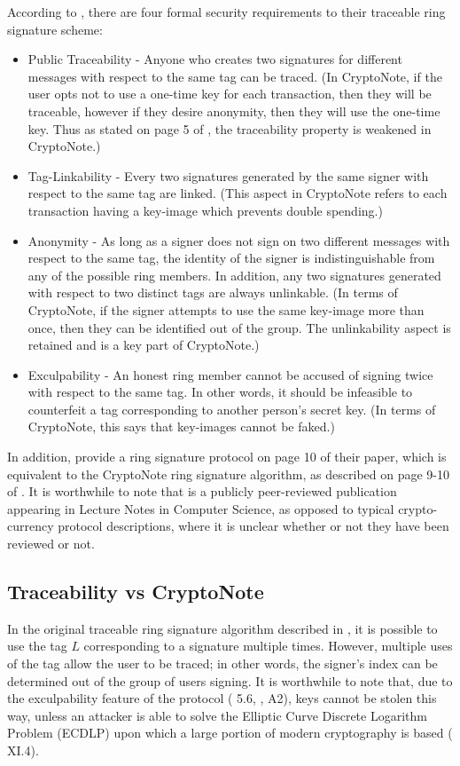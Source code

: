 \documentclass[12pt,english]{mrl}
\numberwithin{equation}{section}
\numberwithin{figure}{section}
\begin{document}
According to \cite{FS}, there are four formal security requirements
to their traceable ring signature scheme:
\begin{itemize}
\item Public Traceability - Anyone who creates two signatures for different
messages with respect to the same tag can be traced. (In CryptoNote,
if the user opts not to use a one-time key for each transaction, then
they will be traceable, however if they desire anonymity, then they
will use the one-time key. Thus as stated on page 5 of \cite{CN},
the traceability property is weakened in CryptoNote.) 
\item Tag-Linkability - Every two signatures generated by the same signer
with respect to the same tag are linked. (This aspect in CryptoNote
refers to each transaction having a key-image which
prevents double spending.) %


\item Anonymity - As long as a signer does not sign on two different messages
with respect to the same tag, the identity of the signer is indistinguishable
from any of the possible ring members. In addition, any two signatures
generated with respect to two distinct tags are always unlinkable.
(In terms of CryptoNote, if the signer attempts to use the same key-image
more than once, then they can be identified out of the group. The
unlinkability aspect is retained and is a key part of CryptoNote.)
\item Exculpability - An honest ring member cannot be accused of signing
twice with respect to the same tag. In other words, it should be infeasible
to counterfeit a tag corresponding to another person's secret key.
(In terms of CryptoNote, this says that key-images cannot be faked.)
\end{itemize}
In addition, \cite{FS} provide a ring signature protocol on page
10 of their paper, which is equivalent to the CryptoNote ring signature
algorithm, as described on page 9-10 of \cite{CN}. It is worthwhile
to note that \cite{FS} is a publicly peer-reviewed publication appearing
in Lecture Notes in Computer Science, as opposed to typical crypto-currency
protocol descriptions, where it is  unclear whether or not they have been reviewed or not. 


\subsection{Traceability vs CryptoNote}

In the original traceable ring signature algorithm described in \cite{FS},
it is possible to use the tag $L$ corresponding to a signature multiple
times. However, multiple uses of the tag allow the user to be traced;
in other words, the signer's index can be determined out of the group of users
signing. It is worthwhile to note that, due to the exculpability
feature of the protocol (\cite{FS} 5.6, \cite{CN}, A2), keys cannot
be stolen this way, unless an attacker is able to solve the Elliptic
Curve Discrete Logarithm Problem (ECDLP) upon which a large portion of modern
cryptography is based (\cite{Si} XI.4).
\end{document}
